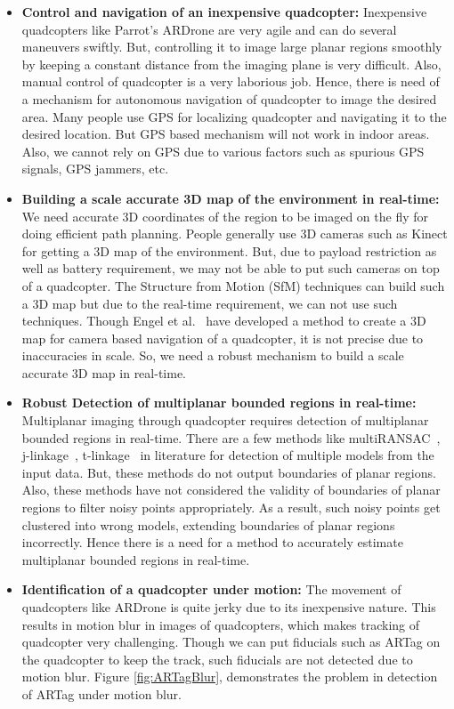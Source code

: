 \begin{itemize}
  \item \textbf{Control and navigation of an inexpensive quadcopter:}
  Inexpensive quadcopters like Parrot's ARDrone are very agile and can do
  several maneuvers swiftly. But, controlling it to image large planar regions
  smoothly by keeping a constant distance from the imaging plane is very
  difficult. Also, manual control of quadcopter is a very laborious job. Hence,
  there is need of a mechanism for autonomous navigation of quadcopter to image
  the desired area. Many people use GPS for localizing quadcopter and navigating
  it to the desired location. But GPS based mechanism will not work in indoor areas. 
  Also, we cannot rely on GPS due to various factors such as spurious GPS
  signals, GPS jammers, etc.
  
  \item \textbf{Building a scale accurate 3D map of the environment in
  real-time:} We need accurate 3D coordinates of the region to be imaged on the fly for
  doing efficient path planning. People generally use 3D cameras such as
  Kinect for getting a 3D map of the environment. But, due to payload
  restriction as well as battery requirement, we may not be able to put such
  cameras on top of a quadcopter. The Structure from Motion (SfM) techniques can
  build such a 3D map but due to the real-time requirement, we can not use such
  techniques. Though Engel et al.~\cite{engel} have developed a method to
  create a 3D map for camera based navigation of a quadcopter, it is not precise
  due to inaccuracies in scale. So, we need a
  robust mechanism to build a scale accurate 3D map in real-time.
  
  \item \textbf{Robust Detection of multiplanar bounded regions in real-time:} 
  Multiplanar imaging through quadcopter requires detection of multiplanar
  bounded regions in real-time. There are a few methods like
  multiRANSAC~\cite{zuliani}, j-linkage~\cite{jlinkage},
  t-linkage~\cite{tlinkage} in literature for detection of multiple models from
  the input data.  But, these methods do not output boundaries of planar
  regions. Also, these methods have not considered the validity of boundaries of
  planar regions to  filter noisy points appropriately. As a result, such noisy
  points get clustered into wrong models, extending boundaries of planar
  regions incorrectly. Hence there is a need for a method to accurately estimate
  multiplanar bounded regions in real-time.
  
  \item \textbf{Identification of a quadcopter under motion:}
  The movement of quadcopters like ARDrone is quite jerky due to its inexpensive
  nature. This results in motion blur in images of quadcopters, which makes
  tracking of quadcopter very challenging. Though we can put fiducials such as
  ARTag on the quadcopter to keep the track, such fiducials are not detected
  due to motion blur. Figure \ref{fig:ARTagBlur}, demonstrates the problem in
  detection of ARTag under motion blur.
  

\end{itemize}
